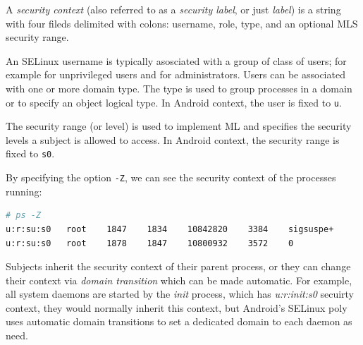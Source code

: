 A \textit{security context} (also referred to as a \textit{security label}, or just \textit{label}) is a string with four fileds delimited with colons: username, role, type, and an optional MLS security range. 

An SELinux username is typically asosciated with a group of class of users; for example  for unprivileged users and  for administrators. Users can be associated with one or more domain type. The type is used to group processes in a domain or to specify an object logical type. In Android context, the user is fixed to \texttt{u}.

The security range (or level) is used to implement ML and specifies the security levels a subject is allowed to access. In Android context, the security range is fixed to \texttt{s0}.

By specifying the option \texttt{-Z}, we can see the security context of the processes running:
\begin{lstlisting}[language=sh]
# ps -Z
u:r:su:s0   root    1847    1834    10842820    3384    sigsuspe+
u:r:su:s0   root    1878    1847    10800932    3572    0  
\end{lstlisting}
Subjects inherit the security context of their parent process, or they can change their context via \textit{domain transition} which can be made automatic. For example, all system daemons are started by the \textit{init} process, which has \textit{u:r:init:s0} secuirty context, they would normally inherit this context, but Android's SELinux poly uses automatic domain transitions to set a dedicated domain to each daemon as need.


